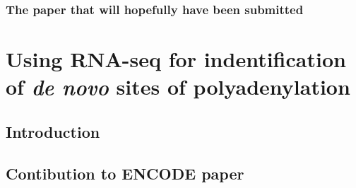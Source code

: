 \documentclass[b5paper]{report}
\begin{document}
\section{The paper that will hopefully have been submitted}

\part{Using RNA-seq for indentification of \textit{de novo} sites of
polyadenylation}

\chapter{Introduction}

\chapter{Contibution to ENCODE paper}
%



\end{document}
